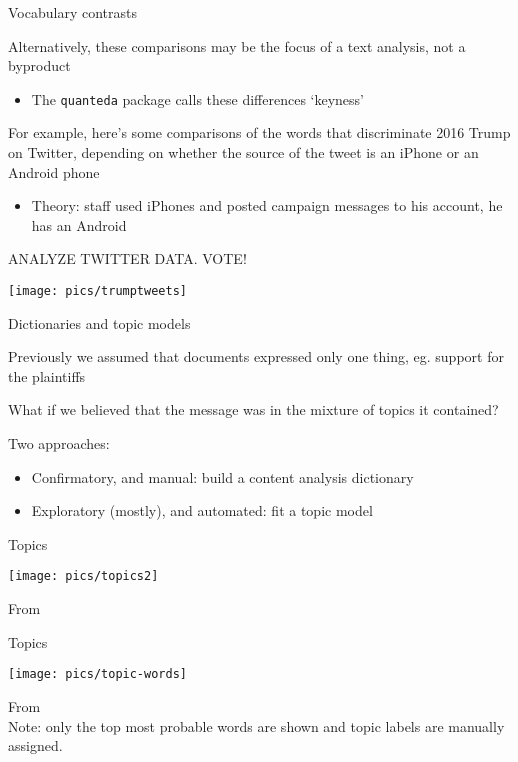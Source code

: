 \documentclass{hertieteaching}
\begin{document}
\begin{frame}{Vocabulary contrasts}

Alternatively, these comparisons may be the focus of a text analysis, not a byproduct
\begin{itemize}
  \item The \texttt{quanteda} package calls these differences `keyness'
\end{itemize}
For example, here's some comparisons of the words that discriminate 2016 Trump on Twitter, depending on whether the source of the tweet is an iPhone or an Android phone
\begin{itemize}
  \item Theory: staff used iPhones and posted campaign messages to his account, he has an Android
\end{itemize}
	
\end{frame}
\begin{frame}{ANALYZE TWITTER DATA. VOTE!}

\centerline{\texttt{[image: pics/trumptweets]}}

\end{frame}





\begin{frame}{Dictionaries and topic models}

Previously we assumed that documents expressed only one thing, eg. support for the plaintiffs

What if we believed that the message was in the mixture of topics it contained?

Two approaches:
\begin{itemize}
  \item Confirmatory, and manual: build a content analysis dictionary
  \item Exploratory (mostly), and automated: fit a topic model
\end{itemize}
  
\end{frame}

\begin{frame}{Topics}

\medskip
\centerline{\texttt{[image: pics/topics2]}}
From \textcite{Blei.etal2003}

\end{frame}

\begin{frame}{Topics}

\medskip
\centerline{\texttt{[image: pics/topic-words]}}
From \textcite{Quinn.etal2006}\\
Note: only the top most probable words are shown and topic labels are manually assigned.

\end{frame}
\end{document}
